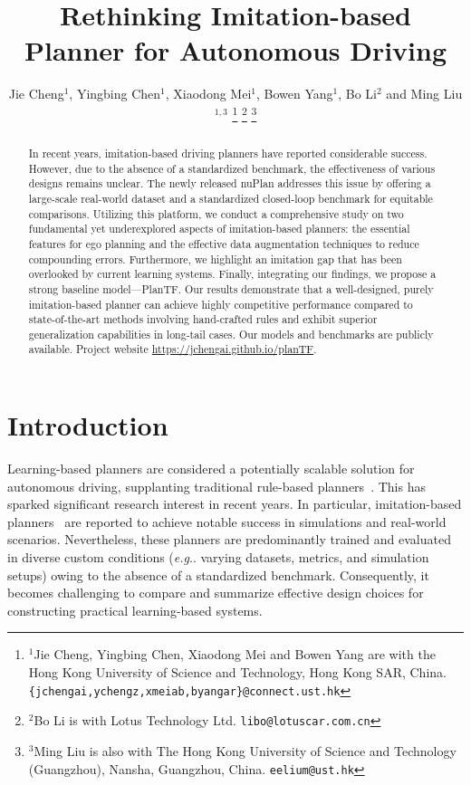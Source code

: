 \documentclass[letterpaper, 10 pt, conference]{ieeeconf}  %
\title{\LARGE \bf
Rethinking Imitation-based Planner for Autonomous Driving
}
\author{Jie Cheng$^{1}$, Yingbing Chen$^{1}$, Xiaodong Mei$^{1}$, Bowen Yang$^{1}$, Bo Li${^2}$ and Ming Liu$^{1,3}$%
\thanks{$^{1}$Jie Cheng, Yingbing Chen, Xiaodong Mei and Bowen Yang are with the Hong Kong University of Science and Technology, Hong Kong SAR, China.\texttt{\{jchengai,ychengz,xmeiab,byangar\}@connect.ust.hk}}%
\thanks{$^{2}$Bo Li is with Lotus Technology Ltd. \texttt{libo@lotuscar.com.cn}}%
\thanks{$^{3}$Ming Liu is also with The Hong Kong University of Science and Technology (Guangzhou), Nansha, Guangzhou, China. \texttt{eelium@ust.hk}} %
}
\makeatletter
\DeclareRobustCommand\onedot{\futurelet\@let@token\@onedot}
\def\@onedot{\ifx\@let@token.\else.\null\fi\xspace}
\def\eg{\emph{e.g}\onedot} \def\Eg{\emph{E.g}\onedot}
\makeatother
\begin{document}
\maketitle
\thispagestyle{empty}
\pagestyle{empty}


\begin{abstract}

In recent years, imitation-based driving planners have reported considerable success. However, due to the absence of a standardized benchmark, the effectiveness of various designs remains unclear. The newly released nuPlan addresses this issue by offering a large-scale real-world dataset and a standardized closed-loop benchmark for equitable comparisons. Utilizing this platform, we conduct a comprehensive study on two fundamental yet underexplored aspects of imitation-based planners: the essential features for ego planning and the effective data augmentation techniques to reduce compounding errors. Furthermore, we highlight an imitation gap that has been overlooked by current learning systems. Finally, integrating our findings, we propose a strong baseline model—PlanTF. Our results demonstrate that a well-designed, purely imitation-based planner can achieve highly competitive performance compared to state-of-the-art methods involving hand-crafted rules and exhibit superior generalization capabilities in long-tail cases. Our models and benchmarks are publicly available. Project website \url{https://jchengai.github.io/planTF}.

\end{abstract}

\section{Introduction}

Learning-based planners are considered a potentially scalable solution for autonomous driving, supplanting traditional rule-based planners~\cite{chen2023e2e, hagedorn2023rethinking,cheng2022gpir}. 
This has sparked significant research interest in recent years. 
In particular, imitation-based planners~\cite{bansal2018chauffeurnet, zhou2021exploring, vitelli2022safetynet, scheel2022urban, cheng2022mpnp, pini2023safepathnet, huang2023gameformer, huang2023dipp, guo2023ccil} are reported to achieve notable success in simulations and real-world scenarios.
Nevertheless,  these planners are predominantly trained and evaluated in diverse custom conditions (\eg varying datasets, metrics, and simulation setups) owing to the absence of a standardized benchmark. Consequently, it becomes challenging to compare and summarize effective design choices for constructing practical learning-based systems. 
\end{document}
